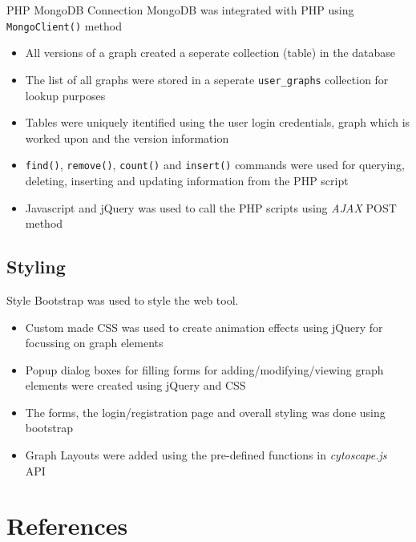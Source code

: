 \documentclass{beamer}
\begin{document}
\begin{frame}{PHP MongoDB Connection}
MongoDB was integrated with PHP using \texttt{MongoClient()} method

\begin{itemize}
\item All versions of a graph created a seperate collection (table) in the database
\item The list of all graphs were stored in a seperate \texttt{user\_graphs} collection for lookup purposes
\item Tables were uniquely itentified using the user login credentials, graph which is worked upon and the version information
\item \texttt{find()}, \texttt{remove()}, \texttt{count()} and \texttt{insert()} commands were used for querying, deleting, inserting and updating information from the PHP script
\item Javascript and jQuery was used to call the PHP scripts using \emph{AJAX} POST method
\end{itemize}

\end{frame}

\subsection{Styling}
\begin{frame}{Style}
Bootstrap \cite{style} was used to style the web tool.

\begin{itemize}
\item Custom made CSS was used to create animation effects using jQuery for focussing on graph elements
\item Popup dialog boxes for filling forms for adding/modifying/viewing graph elements were created using jQuery \cite{animation} and CSS
\item The forms, the login/registration page and overall styling was done using bootstrap 
\item Graph Layouts were added using the pre-defined functions in \emph{cytoscape.js} API\cite{cytoscape_API}

\end{itemize}

\end{frame}


\section{References}
\begin{frame}
    
    
\end{frame}
\end{document}
